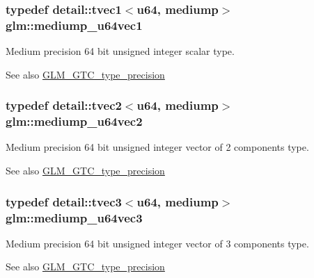 \subsubsection[{\texorpdfstring{mediump\+\_\+u64vec1}{mediump_u64vec1}}]{\setlength{\rightskip}{0pt plus 5cm}typedef detail\+::tvec1$<$u64, mediump$>$ {\bf glm\+::mediump\+\_\+u64vec1}}\hypertarget{group__gtc__type__precision_gaf4211dc9e211d57b34b45a612b6de193}{}\label{group__gtc__type__precision_gaf4211dc9e211d57b34b45a612b6de193}
Medium precision 64 bit unsigned integer scalar type. \begin{DoxySeeAlso}{See also}
\hyperlink{group__gtc__type__precision}{G\+L\+M\+\_\+\+G\+T\+C\+\_\+type\+\_\+precision} 
\end{DoxySeeAlso}
\subsubsection[{\texorpdfstring{mediump\+\_\+u64vec2}{mediump_u64vec2}}]{\setlength{\rightskip}{0pt plus 5cm}typedef detail\+::tvec2$<$u64, mediump$>$ {\bf glm\+::mediump\+\_\+u64vec2}}\hypertarget{group__gtc__type__precision_ga9eda8d6f5be7a2919fb90412535b385f}{}\label{group__gtc__type__precision_ga9eda8d6f5be7a2919fb90412535b385f}
Medium precision 64 bit unsigned integer vector of 2 components type. \begin{DoxySeeAlso}{See also}
\hyperlink{group__gtc__type__precision}{G\+L\+M\+\_\+\+G\+T\+C\+\_\+type\+\_\+precision} 
\end{DoxySeeAlso}
\subsubsection[{\texorpdfstring{mediump\+\_\+u64vec3}{mediump_u64vec3}}]{\setlength{\rightskip}{0pt plus 5cm}typedef detail\+::tvec3$<$u64, mediump$>$ {\bf glm\+::mediump\+\_\+u64vec3}}\hypertarget{group__gtc__type__precision_ga7af0601e6a8ce71bd21ecf67971f5154}{}\label{group__gtc__type__precision_ga7af0601e6a8ce71bd21ecf67971f5154}
Medium precision 64 bit unsigned integer vector of 3 components type. \begin{DoxySeeAlso}{See also}
\hyperlink{group__gtc__type__precision}{G\+L\+M\+\_\+\+G\+T\+C\+\_\+type\+\_\+precision} 
\end{DoxySeeAlso}

